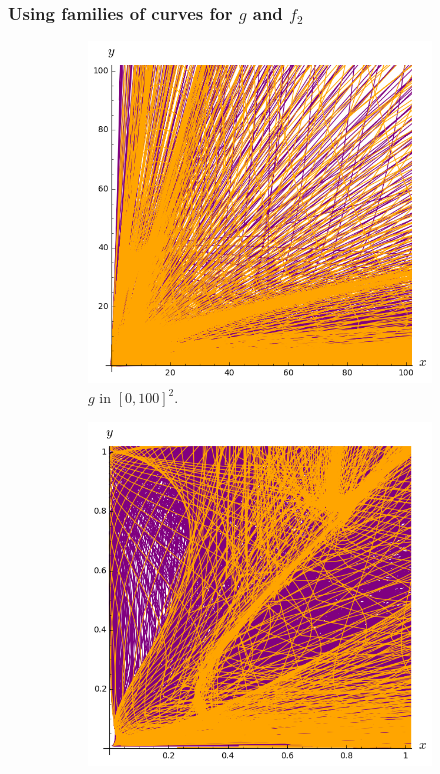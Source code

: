 \documentclass{beamer}
\begin{document}
\begin{frame}
\frametitle{Using families of curves for $g$ and $f_2$}

\begin{figure}
\vspace{-0.2cm}
\begin{subfigure}{.28\linewidth}\centering
\includegraphics[width=1\textwidth]{plots/ch5_25_1curves3.png}
\vspace{-0.1cm}\caption{$g$ in $[0, 100]^2$.}
\end{subfigure} \hspace{0.4cm}
\begin{subfigure}{.28\linewidth}\centering
\includegraphics[width=1\textwidth]{plots/ch5_24_1curves2.png}

\end{subfigure}
\end{figure}
\end{frame}
\end{document}
